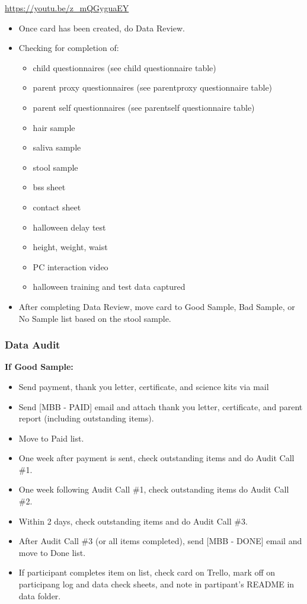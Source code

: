 \documentclass[]{book}
\providecommand{\tightlist}{%
  \setlength{\itemsep}{0pt}\setlength{\parskip}{0pt}}
\begin{document}
\url{https://youtu.be/z_mQGyguaEY}

\begin{itemize}
\tightlist
\item
  Once card has been created, do Data Review.
\item
  Checking for completion of:

  \begin{itemize}
  \tightlist
  \item
    child questionnaires (see child questionnaire table)
  \item
    parent proxy questionnaires (see parentproxy questionnaire table)
  \item
    parent self questionnaires (see parentself questionnaire table)
  \item
    hair sample
  \item
    saliva sample
  \item
    stool sample
  \item
    bss sheet
  \item
    contact sheet
  \item
    halloween delay test
  \item
    height, weight, waist
  \item
    PC interaction video
  \item
    halloween training and test data captured
  \end{itemize}
\item
  After completing Data Review, move card to Good Sample, Bad Sample, or No Sample list based on the stool sample.
\end{itemize}

\hypertarget{data-audit}{%
\subsubsection{Data Audit}\label{data-audit}}

\textbf{If Good Sample:}

\begin{itemize}
\tightlist
\item
  Send payment, thank you letter, certificate, and science kits via mail
\item
  Send {[}MBB - PAID{]} email and attach thank you letter, certificate, and parent report (including outstanding items).
\item
  Move to Paid list.
\item
  One week after payment is sent, check outstanding items and do Audit Call \#1.
\item
  One week following Audit Call \#1, check outstanding items do Audit Call \#2.
\item
  Within 2 days, check outstanding items and do Audit Call \#3.
\item
  After Audit Call \#3 (or all items completed), send {[}MBB - DONE{]} email and move to Done list.
\item
  If participant completes item on list, check card on Trello, mark off on participang log and data check sheets, and note in partipant's README in data folder.
\end{itemize}
\end{document}
